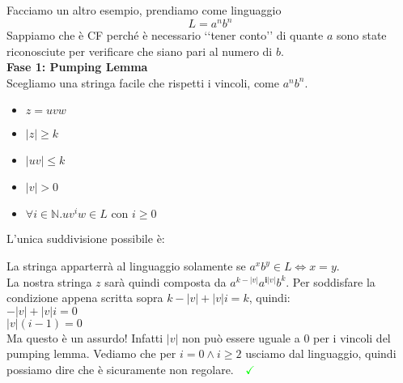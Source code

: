 \documentclass[a4paper,oneside]{scrbook}
\newcommand{\greenmark}{\quad \textcolor{green}{\checkmark}}
\begin{document}
Facciamo un altro esempio, prendiamo come linguaggio
$$L={a^nb^n}$$
Sappiamo che è CF perché è necessario ‘‘tener conto’’ di quante $a$ sono state riconosciute per verificare che siano pari al numero di $b$.\\
\textbf{Fase 1: Pumping Lemma}\\
Scegliamo una stringa facile che rispetti i vincoli, come $a^nb^n$.
\begin{itemize}
	\item $z=uvw$
	\item $|z|\geq k$
	\item $|uv|\leq k$
	\item $|v|>0$
	\item $\forall i \in \mathbb{N}.uv^iw\in L \text{ con }i\geq0$
\end{itemize}
L'unica suddivisione possibile è:
\begin{center}
\end{center}
La stringa apparterrà al linguaggio solamente se $a^xb^y\in L \Leftrightarrow x=y$.\\
La nostra stringa $z$ sarà quindi composta da $a^{k-|v|}a^{\textbf{i}|v|}b^k$. Per soddisfare la condizione appena scritta sopra $k-|v|+|v|i=k$, quindi:\\
$-|v|+|v|i=0$\\
$|v|(i-1)=0$\\
Ma questo è un assurdo! Infatti $|v|$ non può essere uguale a $0$ per i vincoli del pumping lemma.
Vediamo che per $i=0 \wedge i\geq2$ usciamo dal linguaggio, quindi possiamo dire che è sicuramente non regolare.$\greenmark$\\
\end{document}
